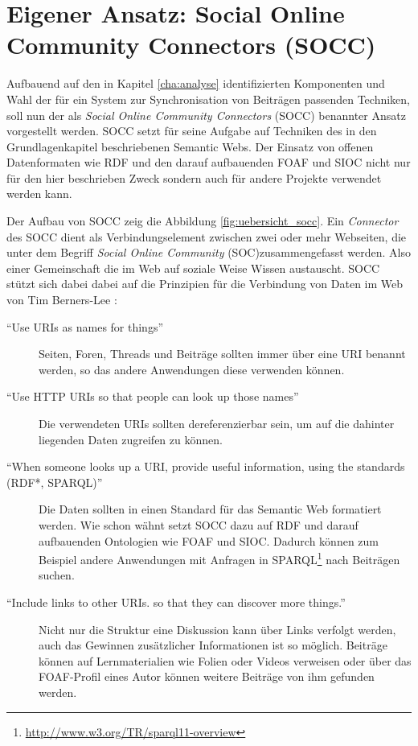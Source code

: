 
\chapter{Eigener Ansatz: Social Online Community Connectors (SOCC)} %
\label{cha:eigener_ansatz_social_online_community_connectors_socc_}

Aufbauend auf den in Kapitel \ref{cha:analyse} identifizierten Komponenten und Wahl der für ein System zur Synchronisation von Beiträgen passenden Techniken, soll nun der als \emph{Social Online Community Connectors} (SOCC) benannter Ansatz vorgestellt werden. SOCC setzt für seine Aufgabe auf Techniken des in den Grundlagenkapitel beschriebenen Semantic Webs. Der Einsatz von offenen Datenformaten wie RDF und den darauf aufbauenden FOAF und SIOC nicht nur für den hier beschrieben Zweck sondern auch für andere Projekte verwendet werden kann. 

Der Aufbau von SOCC zeig die Abbildung \ref{fig:uebersicht_socc}. Ein \emph{Connector} des SOCC dient als Verbindungselement zwischen zwei oder mehr Webseiten, die unter dem Begriff \emph{Social Online Community} (SOC)zusammengefasst werden. Also einer Gemeinschaft die im Web auf soziale Weise Wissen austauscht. SOCC stützt sich dabei dabei auf die Prinzipien für die Verbindung von Daten im Web von Tim Berners-Lee \cite{Berners-Lee2009}:

\begin{description}
    \item[\enquote{Use URIs as names for things}] Seiten, Foren, Threads und Beiträge sollten immer über eine URI benannt werden, so das andere Anwendungen diese verwenden können.

    \item[\enquote{Use HTTP URIs so that people can look up those names}] Die verwendeten URIs sollten dereferenzierbar sein, um auf die dahinter liegenden Daten zugreifen zu können.

    \item[\enquote{When someone looks up a URI, provide useful information, using the standards (RDF*, SPARQL)}] Die Daten sollten in einen Standard für das Semantic Web formatiert werden. Wie schon wähnt setzt SOCC dazu auf RDF und darauf aufbauenden Ontologien wie FOAF und SIOC. Dadurch können zum Beispiel andere Anwendungen mit Anfragen in SPARQL\footnote{\url{http://www.w3.org/TR/sparql11-overview}} nach Beiträgen suchen.

    \item[\enquote{Include links to other URIs. so that they can discover more things.}] Nicht nur die Struktur eine Diskussion kann über Links verfolgt werden, auch das Gewinnen zusätzlicher Informationen ist so möglich. Beiträge können auf Lernmaterialien wie Folien oder Videos verweisen oder über das FOAF-Profil eines Autor können weitere Beiträge von ihm gefunden werden. 
\end{description}

